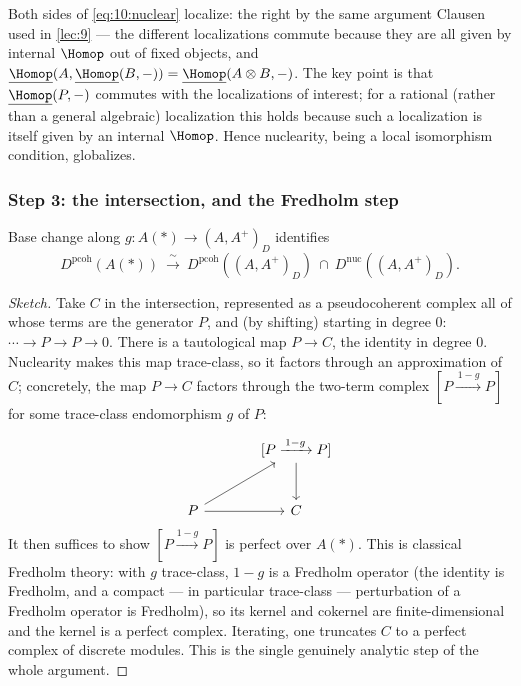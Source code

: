 \begin{remark}
\label{rmk:10:nuclear-globalize}
Both sides of \eqref{eq:10:nuclear} localize: the right by the same argument
Clausen used in \cref{lec:9} --- the different localizations commute because they
are all given by internal $\Homop$ out of fixed objects, and
$\underline{\Homop}(A,\underline{\Homop}(B,-))=\underline{\Homop}(A\otimes B,-)$.
The key point is that $\underline{\Homop}(P,-)$ commutes with the localizations of
interest; for a rational (rather than a general algebraic) localization this holds
because such a localization is itself given by an internal $\Homop$. Hence
nuclearity, being a local isomorphism condition, globalizes.
\end{remark}

\subsubsection*{Step 3: the intersection, and the Fredholm step}

\begin{proposition}[Discrete pseudocoherent $=$ solid pseudocoherent $\cap$ nuclear]
\label{prop:10:intersection}
Base change along $g\colon A(\ast)\to(A,A^{+})_{D}$ identifies
\begin{equation*}
D^{\mathrm{pcoh}}(A(\ast))\ \xrightarrow{\ \sim\ }\
D^{\mathrm{pcoh}}((A,A^{+})_{D})\ \cap\ D^{\mathrm{nuc}}((A,A^{+})_{D}).
\end{equation*}
\end{proposition}

\begin{proof}[Sketch]
Take $C$ in the intersection, represented as a pseudocoherent complex all of whose
terms are the generator $P$, and (by shifting) starting in degree $0$:
$\cdots\to P\to P\to0$. There is a tautological map $P\to C$, the identity in
degree $0$. Nuclearity makes this map trace-class, so it factors through an
approximation of $C$; concretely, the map $P\to C$ factors through the two-term
complex $[P\xrightarrow{\,1-g\,}P]$ for some trace-class endomorphism $g$ of $P$:
\[
\begin{tikzcd}[row sep=large, column sep=large]
& {[P\xrightarrow{\,1-g\,}P]} \arrow[d] \\
P \arrow[ur] \arrow[r] & C
\end{tikzcd}
\]
It then suffices to show $[P\xrightarrow{1-g}P]$ is perfect over $A(\ast)$. This is
classical Fredholm theory: with $g$ trace-class, $1-g$ is a Fredholm operator
(the identity is Fredholm, and a compact --- in particular trace-class ---
perturbation of a Fredholm operator is Fredholm), so its kernel and cokernel are
finite-dimensional and the kernel is a perfect complex. Iterating, one truncates
$C$ to a perfect complex of discrete modules. This is the single genuinely
analytic step of the whole argument.
\end{proof}

